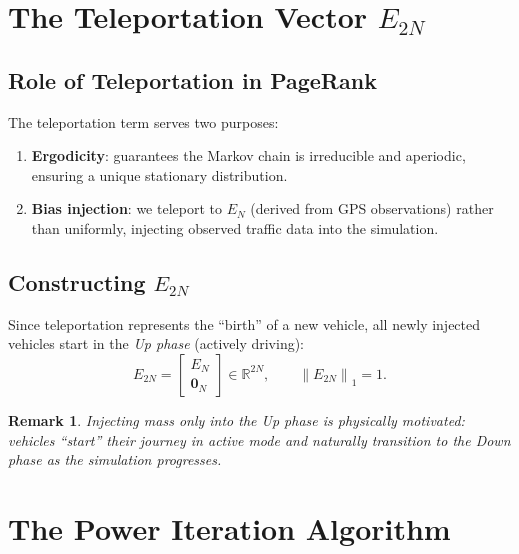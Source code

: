 \documentclass[12pt,a4paper]{article}
\theoremstyle{definition}
\theoremstyle{plain}
\newtheorem{remark}{Remark}[section]
\newcommand{\norm}[1]{\left\|#1\right\|}
\begin{document}
\section{The Teleportation Vector $E_{2N}$}
\label{sec:teleport}

\subsection{Role of Teleportation in PageRank}

The teleportation term serves two purposes:
\begin{enumerate}
  \item \textbf{Ergodicity}: guarantees the Markov chain is irreducible and aperiodic,
    ensuring a unique stationary distribution.
  \item \textbf{Bias injection}: we teleport to $E_N$ (derived from GPS observations)
    rather than uniformly, injecting observed traffic data into the simulation.
\end{enumerate}

\subsection{Constructing $E_{2N}$}

Since teleportation represents the ``birth'' of a new vehicle, all newly injected
vehicles start in the \emph{Up phase} (actively driving):
\begin{equation}
  \boxed{E_{2N} = \begin{bmatrix} E_N \\ \mathbf{0}_N \end{bmatrix}}
  \in \mathbb{R}^{2N}, \qquad \norm{E_{2N}}_1 = 1.
  \label{eq:E2N}
\end{equation}

\begin{remark}
  Injecting mass only into the Up phase is physically motivated: vehicles ``start''
  their journey in active mode and naturally transition to the Down phase as the
  simulation progresses.
\end{remark}

\section{The Power Iteration Algorithm}
\label{sec:poweriter}
\end{document}

